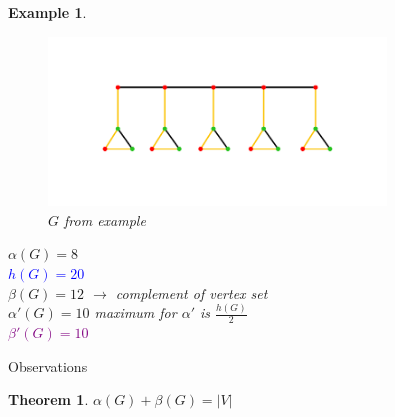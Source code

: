 \documentclass[notitlepage]{article}
\newtheorem*{theorem}{Theorem}
\newtheorem*{example}{Example}
\begin{document}
\begin{example}
    \begin{figure}[h]
      \includegraphics[width=0.8\textwidth]{first_example.pdf}
      \centering
      \caption{$G$ from example}
    \end{figure}

    \textcolor{BrickRed}{$\alpha(G) = 8$}\\
    \textcolor{blue}{$h(G) = 20$}\\
    \textcolor{OliveGreen}{$\beta(G) = 12$} $\rightarrow$ complement of vertex set\\
    \textcolor{Dandelion}{$\alpha'(G) = 10$} maximum for $\alpha'$ is $\frac{h(G)}{2}$\\
    \textcolor{purple}{$\beta'(G) = 10$}
\end{example}
\newpage
\Large{Observations}
\begin{theorem}
  $\alpha(G) + \beta(G) = |V|$
\end{theorem}
\end{document}
